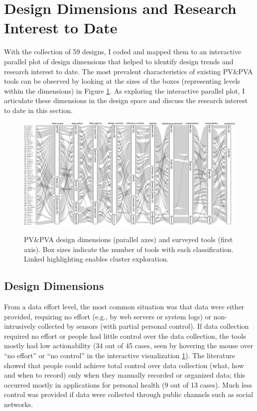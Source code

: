 \documentclass[12pt,oneside]{book}
\begin{document}
\section{Design Dimensions and Research Interest to Date}
With the collection of 59 designs, I coded and mapped them to an interactive parallel plot of design dimensions that helped to identify design trends and research interest to date. The most prevalent characteristics of existing PV\&PVA tools can be observed by looking at the sizes of the boxes (representing levels within the dimensions) in Figure \ref{fig:rw_pva}. As exploring the interactive parallel plot, I articulate these dimensions in the design space and discuss the research interest to date in this section.

\begin{figure}[ht]
\centering
\includegraphics[width=\columnwidth]{figures/RW_pva}
\label{fig:rw_pva}
\caption{PV\&PVA design dimensions (parallel axes) and surveyed tools (first axis). Box sizes indicate the number of tools with each classification. Linked highlighting enables cluster exploration.}
\end{figure}

\subsection{Design Dimensions}
From a data effort level, the most common situation was that data were either provided, requiring no effort (e.g., by web servers or system logs) or non-intrusively collected by sensors (with partial personal control).  If data collection required no effort or people had little control over the data collection, the tools mostly had low actionability (34 out of 45 cases, seen by hovering the mouse over ``no effort'' or ``no control'' in the interactive visualization \ref{fig:rw_pva}). The literature showed that people could achieve total control over data collection (what, how and when to record) only when they manually recorded or organized data;  this occurred mostly in applications for personal health (9 out of 13 cases).  Much less control was provided if data were collected through public channels such as social networks. 
\end{document}
